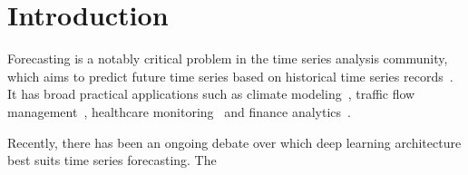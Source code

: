 \vspace{-2em}
\section{Introduction}

Forecasting is a notably critical problem in the time series analysis community, which aims to predict future time series based on historical time series records~\cite{wang2024deep}. It has broad practical applications such as climate modeling~\cite{wu2023interpretable}, traffic flow management~\cite{yin2021deep}, healthcare monitoring~\cite{kaushik2020ai} and finance analytics~\cite{granger2014forecasting}. 

Recently, there has been an ongoing debate over which deep learning architecture best suits time series forecasting. The 
 

